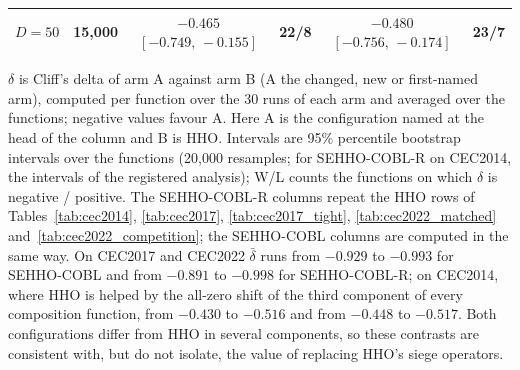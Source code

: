 \begin{table}[htbp]
{\begin{tabular}{llcccc}
\quad $D=50$ & 15{,}000 & $-0.465$ $[-0.749,\,-0.155]$ & 22/8 & $-0.480$ $[-0.756,\,-0.174]$ & 23/7 \\
\bottomrule
\end{tabular}}
\begin{flushleft}\footnotesize
$\delta$ is Cliff's delta of arm A against arm B (A the changed, new or first-named arm), computed per function over the 30 runs of each arm and averaged over the functions; negative values favour A. Here A is the configuration named at the head of the column and B is HHO. Intervals are 95\% percentile bootstrap intervals over the functions (20{,}000 resamples; for SEHHO-COBL-R on CEC2014, the intervals of the registered analysis); W/L counts the functions on which $\delta$ is negative / positive. The SEHHO-COBL-R columns repeat the HHO rows of Tables~\ref{tab:cec2014}, \ref{tab:cec2017}, \ref{tab:cec2017_tight}, \ref{tab:cec2022_matched} and~\ref{tab:cec2022_competition}; the SEHHO-COBL columns are computed in the same way. On CEC2017 and CEC2022 $\bar\delta$ runs from $-0.929$ to $-0.993$ for SEHHO-COBL and from $-0.891$ to $-0.998$ for SEHHO-COBL-R; on CEC2014, where HHO is helped by the all-zero shift of the third component of every composition function, from $-0.430$ to $-0.516$ and from $-0.448$ to $-0.517$. Both configurations differ from HHO in several components, so these contrasts are consistent with, but do not isolate, the value of replacing HHO's siege operators.
\end{flushleft}
\end{table}
